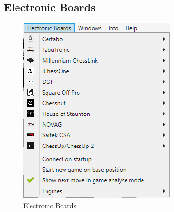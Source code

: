 \documentclass[11pt,a4paper]{article}
\begin{document}
	\subsection{Electronic Boards}
	\begin{figure}[H]
		\centering
		\includegraphics[scale=1.0]{ElectronicBoards.png}
		\caption{Electronic Boards}
		\label{fig:ElectronicBoards}
	\end{figure}
\end{document}
